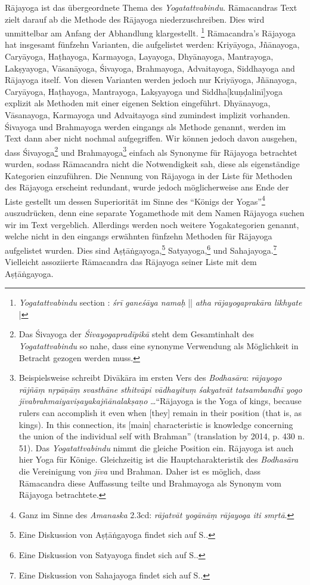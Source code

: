 Rājayoga ist das übergeordnete Thema des \emph{Yogatattvabindu}. Rāmacandras Text zielt darauf ab die Methode des Rājayoga niederzuschreiben. Dies wird unmittelbar am Anfang der Abhandlung klargestellt. \footnote{\emph{Yogatattvabindu} section : \textit{śrī ganeśāya namaḥ} || \textit{atha rājayogaprakāra likhyate} |} Rāmacandra's Rājayoga hat insgesamt fünfzehn Varianten, die aufgelistet werden: Kriyāyoga, Jñānayoga, Caryāyoga, Haṭhayoga, Karmayoga, Layayoga, Dhyānayoga, Mantrayoga, Lakṣyayoga, Vāsanāyoga, Śivayoga, Brahmayoga, Advaitayoga, Siddhayoga and Rājayoga itself. Von diesen Varianten werden jedoch nur Kriyāyoga, Jñānayoga, Caryāyoga, Haṭhayoga, Mantrayoga, Lakṣyayoga und Siddha[kuṇḍalinī]yoga explizit als Methoden mit einer eigenen Sektion eingeführt. Dhyānayoga, Vāsanayoga, Karmayoga und Advaitayoga sind zumindest implizit vorhanden. Śivayoga und Brahmayoga werden eingangs als Methode genannt, werden im Text dann aber nicht nochmal aufgegriffen. Wir können jedoch davon ausgehen, dass Śivayoga\footnote{Das Śivayoga der \textit{Śivayogapradīpikā} steht dem Gesamtinhalt des \textit{Yogatattvabindu} so nahe, dass eine synonyme Verwendung als Möglichkeit in Betracht gezogen werden muss.} und Brahmayoga\footnote{Beispielsweise schreibt Divākāra im ersten Vers des \textit{Bodhasāra}: \textit{rājayogo rājñāṃ nṛpāṇāṃ svasthāne sthitvāpi vādhayituṃ śakyatvāt tatsambandhī yogo jīvabrahmaiyaviṣayakajñānalakṣaṇo} \ldots ``Rājayoga is the Yoga of kings, because rulers can accomplish it even when [they] remain in their position (that is, as kings). In this connection, its [main] characteristic is knowledge concerning the union of the individual self with Brahman'' (translation by \citeauthor{birch2014} 2014, p. 430 n. 51). Das \emph{Yogatattvabindu} nimmt die gleiche Position ein. Rājayoga ist auch hier Yoga für Könige. Gleichzeitig ist die Hauptcharakteristik des \emph{Bodhasāra} die Vereinigung von \textit{jīva} und Brahman. Daher ist es möglich, dass Rāmacandra diese Auffassung teilte und Brahmayoga als Synonym vom Rājayoga betrachtete.} einfach als Synonyme für Rājayoga betrachtet wurden, sodass Rāmacandra nicht die Notwendigkeit sah, diese als eigenständige Kategorien einzuführen. Die Nennung von Rājayoga in der Liste für Methoden des Rājayoga erscheint redundant, wurde jedoch möglicherweise ans Ende der Liste gestellt um dessen Superiorität im Sinne des ``Königs der Yogas''\footnote{Ganz im Sinne des \emph{Amanaska} 2.3cd: \textit{rājatvāt yogānāṃ rājayoga iti smṛtā}.} auszudrücken, denn eine separate Yogamethode mit dem Namen Rājayoga suchen wir im Text vergeblich. Allerdings werden noch weitere Yogakategorien genannt, welche nicht in den eingangs erwähnten fünfzehn Methoden für Rājayoga aufgelistet wurden. Dies sind Aṣṭāṅgayoga,\footnote{Eine Diskussion von Aṣṭāṅgayoga findet sich auf S.\pageref{ashtangayoga}.} Satyayoga,\footnote{Eine Diskussion von Satyayoga findet sich auf S.\pageref{satyayoga}.} und Sahajayoga.\footnote{Eine Diskussion von Sahajayoga findet sich auf S.\pageref{sahajayoga}.} Vielleicht assoziierte Rāmacandra das Rājayoga seiner Liste mit dem Aṣṭāṅgayoga.

